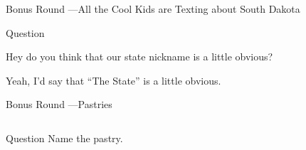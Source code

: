 \documentclass[11pt]{beamer}
\begin{document}
\begin{frame}[t]{Bonus Round ---All the Cool Kids are Texting about South Dakota}
\begin{block}{Question}

\begin{minipage}{0.9\textwidth}
\begin{mdframed}[
    roundcorner=7pt,
    backgroundcolor=black!5,
    linecolor=black!5,
    fontcolor=black,
    ignorelastdescenders]
\begin{flushleft}
{\small{}\selectfont{}
Hey do you think that our state nickname is a little obvious?
}
\end{flushleft}
\end{mdframed}
\end{minipage}

\hfill{}\begin{minipage}{0.9\textwidth}
\begin{mdframed}[
    roundcorner=7pt,
    backgroundcolor=blue!80!white,
    linecolor=blue!80!white,
    fontcolor=white,
    ignorelastdescenders]
\begin{flushleft}
{\small{}\selectfont{}
Yeah, I'd say that ``The \textunderscore{}\textunderscore{}\textunderscore{}\textunderscore{}\textunderscore{}\textunderscore{} \textunderscore{}\textunderscore{}\textunderscore{}\textunderscore{}\textunderscore{}\textunderscore{} State'' is a little obvious.
}
\end{flushleft}
\end{mdframed}
\end{minipage}
\end{block}
\end{frame}
\begin{frame}[t]{Bonus Round ---Pastries}
\begin{columns}[T,totalwidth=\linewidth]
\begin{column}{0.32\linewidth}
\begin{block}{Question}
Name the pastry.
\end{block}
\end{column}
\begin{column}{0.65\linewidth}
\begin{center}
\texttt{[image: \{Images/cronut]}.jpg}
\end{center}
\end{column}
\end{columns}
\end{frame}
\end{document}
